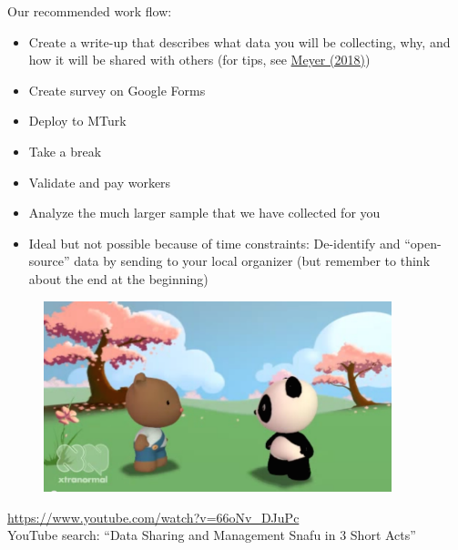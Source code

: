 \documentclass[aspectratio=169]{beamer}
\begin{document}
%
\begin{frame}

Our recommended work flow:
\begin{itemize}
\item Create a write-up that describes what data you will be collecting, why, and how it will be shared with others (for tips, see \href{https://doi.org/10.1177/2515245917747656}{Meyer (2018)})
\item Create survey on Google Forms
\item Deploy to MTurk
\item Take a break
\item Validate and pay workers
\item Analyze the much larger sample that we have collected for you
\item Ideal but not possible because of time constraints: De-identify and ``open-source'' data by sending to your local organizer (but remember to think about the end at the beginning)
\end{itemize}

\end{frame}
\begin{frame}

\begin{figure}
  \centering
  \includegraphics[width=0.9\textwidth]{figures/pandas_video}
\end{figure}

\url{https://www.youtube.com/watch?v=66oNv_DJuPc}\\
YouTube search: ``Data Sharing and Management Snafu in 3 Short Acts''

\end{frame}
\end{document}
